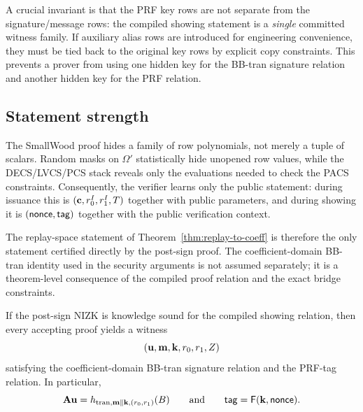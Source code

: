 A crucial invariant is that the PRF key rows are not separate from the signature/message rows: the compiled
showing statement is a \emph{single} committed witness family.  If auxiliary alias rows are introduced for
engineering convenience, they must be tied back to the original key rows by explicit copy constraints.  This
prevents a prover from using one hidden key for the BB-tran signature relation and another hidden key for the
PRF relation.

\subsection{Statement strength}
\label{subsec:statement-strength}
The SmallWood proof hides a family of row polynomials, not merely a tuple of scalars.  Random masks on
$\Omega'$ statistically hide unopened row values, while the DECS/LVCS/PCS stack reveals only the evaluations
needed to check the PACS constraints.  Consequently, the verifier learns only the public statement: during
issuance this is $(\mathbf{c},r_0^I,r_1^I,T)$ together with public parameters, and during showing it is
$(\mathsf{nonce},\mathsf{tag})$ together with the public verification context.

The replay-space statement of Theorem~\ref{thm:replay-to-coeff} is therefore the only statement certified
directly by the post-sign proof.  The coefficient-domain BB-tran identity used in the security arguments is not
assumed separately; it is a theorem-level consequence of the compiled proof relation and the exact bridge
constraints.

\begin{corollary}\label{cor:showing-proof-consequence}
If the post-sign NIZK is knowledge sound for the compiled showing relation, then every accepting proof yields a
witness
\[
  (\mathbf{u},\mathbf{m},\mathbf{k},r_0,r_1,Z)
\]
satisfying the coefficient-domain BB-tran signature relation and the PRF-tag relation.  In particular,
\[
  \mathbf{A}\mathbf{u}=h_{\mathrm{tran},\mathbf{m}\Vert\mathbf{k},(r_0,r_1)}(B)
  \qquad\text{and}\qquad
  \mathsf{tag}=\mathsf{F}(\mathbf{k},\mathsf{nonce}).
\]
\end{corollary}
